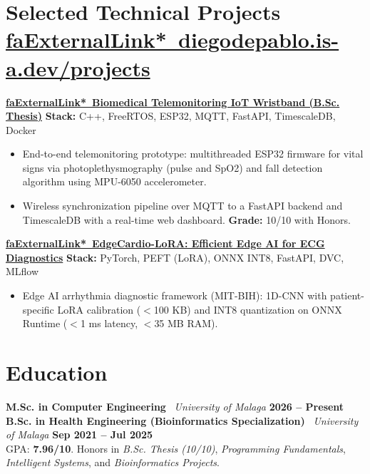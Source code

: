 \documentclass[a4paper,10pt]{article}
\begin{document}
\section*{Selected Technical Projects \hfill {\normalfont\scriptsize\color{subtext}\href{https://diegodepablo.is-a.dev/projects}{\csname faExternalLink*\endcsname\ diegodepablo.is-a.dev/projects}}}

\noindent\textbf{\href{https://diegodepablo.is-a.dev/projects/tfg-patient-monitoring}{\csname faExternalLink*\endcsname\ Biomedical Telemonitoring IoT Wristband (B.Sc. Thesis)}} \hfill {\scriptsize\color{subtext}\textbf{Stack:} C++, FreeRTOS, ESP32, MQTT, FastAPI, TimescaleDB, Docker}
\begin{itemize}
  \item End-to-end telemonitoring prototype: multithreaded ESP32 firmware for vital signs via photoplethysmography (pulse and SpO2) and fall detection algorithm using MPU-6050 accelerometer.
  \item Wireless synchronization pipeline over MQTT to a FastAPI backend and TimescaleDB with a real-time web dashboard. \textbf{Grade:} 10/10 with Honors.
\end{itemize}

\vspace{4.5pt}

\noindent\textbf{\href{https://diegodepablo.is-a.dev/projects/edgecardio-lora}{\csname faExternalLink*\endcsname\ EdgeCardio-LoRA: Efficient Edge AI for ECG Diagnostics}} \hfill {\scriptsize\color{subtext}\textbf{Stack:} PyTorch, PEFT (LoRA), ONNX INT8, FastAPI, DVC, MLflow}
\begin{itemize}
  \item Edge AI arrhythmia diagnostic framework (MIT-BIH): 1D-CNN with patient-specific LoRA calibration ($<$100 KB) and INT8 quantization on ONNX Runtime ($<$1 ms latency, $<$35 MB RAM).
\end{itemize}

\section*{Education}

\noindent\textbf{M.Sc. in Computer Engineering} \textbar\ \textit{University of Malaga} \hfill {\footnotesize\color{subtext}\textbf{2026 -- Present}} \\[2.5pt]
\noindent\textbf{B.Sc. in Health Engineering (Bioinformatics Specialization)} \textbar\ \textit{University of Malaga} \hfill {\footnotesize\color{subtext}\textbf{Sep 2021 -- Jul 2025}} \\
{\footnotesize GPA: \textbf{7.96/10}. Honors in \textit{B.Sc. Thesis (10/10)}, \textit{Programming Fundamentals}, \textit{Intelligent Systems}, and \textit{Bioinformatics Projects}.}
\end{document}
